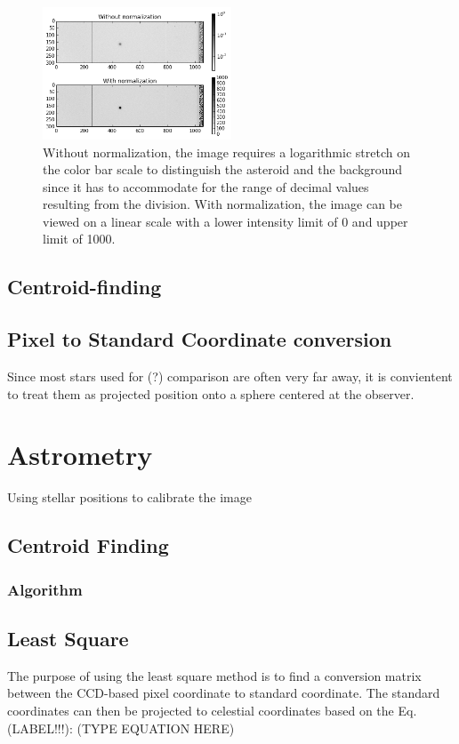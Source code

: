 \documentclass[authoryear, 12pt,5p, times]{elsarticle}
\begin{document}
	\begin{figure}[h!]
\includegraphics[width=0.5\textwidth]{figures/normalization}
\caption{Without normalization, the image requires a logarithmic stretch on the color bar scale to distinguish the asteroid and the background since it has to accommodate for the range of decimal values resulting from the division. With normalization, the image can be viewed on a linear scale with a lower intensity limit of 0 and upper limit of 1000.}
\label{normalization}
\end{figure}

\subsection{Centroid-finding}
\subsection{Pixel to Standard Coordinate conversion}
Since most stars used for (?) comparison are often very far away, it is convientent to treat them as projected position onto a sphere centered at the observer.
\section{Astrometry}
Using stellar positions to calibrate the image
	\subsection{Centroid Finding}
		\subsubsection{Algorithm}
	\subsection{Least Square}
	The purpose of using the least square method is to find a conversion matrix between the CCD-based pixel coordinate to standard coordinate.
	The standard coordinates can then be projected to celestial coordinates based on the Eq. (LABEL!!!):
	(TYPE EQUATION HERE)
\end{document}
